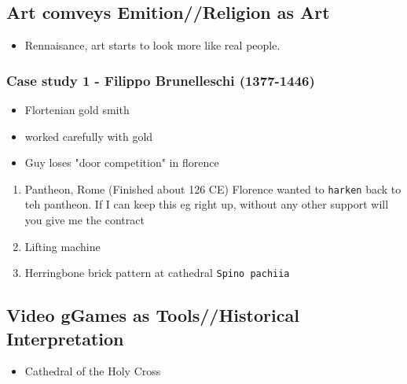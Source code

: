 \documentclass[11pt]{article}
\begin{document}
\subsection{Art comveys Emition//Religion as Art}
\label{sec-9-6}
\begin{itemize}
\item Rennaisance, art starts to look more like real people.
\end{itemize}

\subsubsection{Case study 1 - Filippo Brunelleschi (1377-1446)}
\label{sec-9-6-1}
\begin{itemize}
\item Flortenian gold smith
\item worked carefully with gold
\item Guy loses "door competition" in florence
\end{itemize}
\begin{enumerate}
\item Pantheon, Rome (Finished about 126 CE)
\label{sec-9-6-1-1}
Florence wanted to \texttt{harken} back to teh pantheon.
If I can keep this eg right up, without any other support will you give me the contract
\item Lifting machine
\label{sec-9-6-1-2}

\item Herringbone brick pattern at cathedral \texttt{Spino pachiia}
\label{sec-9-6-1-3}
\end{enumerate}

\subsection{Video gGames as Tools//Historical Interpretation}
\label{sec-9-7}
\begin{itemize}
\item Cathedral of the Holy Cross
\end{itemize}
\end{document}

